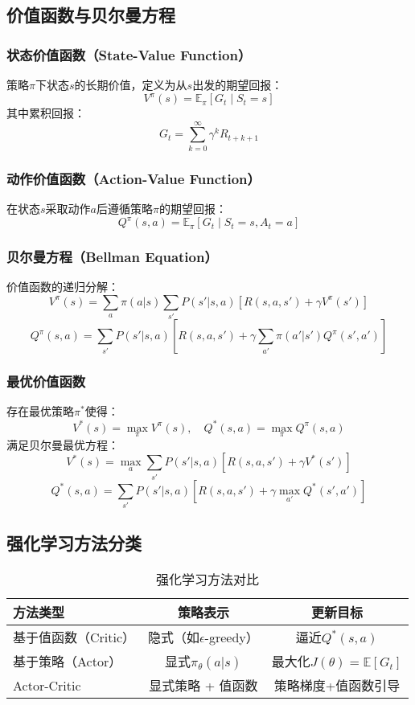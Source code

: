 \subsection{价值函数与贝尔曼方程}
\subsubsection{状态价值函数（State-Value Function）}
策略$\pi$下状态$s$的长期价值，定义为从$s$出发的期望回报：
\[
V^\pi(s) = \mathbb{E}_\pi \left[ G_t \mid S_t = s \right]
\]
其中累积回报：
\[
G_t = \sum_{k=0}^\infty \gamma^k R_{t+k+1}
\]

\subsubsection{动作价值函数（Action-Value Function）}
在状态$s$采取动作$a$后遵循策略$\pi$的期望回报：
\[
Q^\pi(s,a) = \mathbb{E}_\pi \left[ G_t \mid S_t = s, A_t = a \right]
\]

\subsubsection{贝尔曼方程（Bellman Equation）}
价值函数的递归分解：
\[
V^\pi(s) = \sum_{a} \pi(a|s) \sum_{s'} P(s'|s,a) \left[ R(s,a,s') + \gamma V^\pi(s') \right]
\]
\[
Q^\pi(s,a) = \sum_{s'} P(s'|s,a) \left[ R(s,a,s') + \gamma \sum_{a'} \pi(a'|s') Q^\pi(s',a') \right]
\]

\subsubsection{最优价值函数}
存在最优策略$\pi^*$使得：
\[
V^*(s) = \max_\pi V^\pi(s), \quad Q^*(s,a) = \max_\pi Q^\pi(s,a)
\]
满足贝尔曼最优方程：
\[
V^*(s) = \max_{a} \sum_{s'} P(s'|s,a) \left[ R(s,a,s') + \gamma V^*(s') \right]
\]
\[
Q^*(s,a) = \sum_{s'} P(s'|s,a) \left[ R(s,a,s') + \gamma \max_{a'} Q^*(s',a') \right]
\]

\subsection{强化学习方法分类}
\begin{table}[htbp]
  \centering
  \caption{强化学习方法对比}
  \begin{tabular}{lcc}
    \toprule
    \textbf{方法类型} & \textbf{策略表示} & \textbf{更新目标} \\
    \midrule
    基于值函数（Critic） & 隐式（如$\epsilon$-greedy） & 逼近$Q^*(s,a)$ \\
    基于策略（Actor） & 显式$\pi_\theta(a|s)$ & 最大化$J(\theta) = \mathbb{E}[G_t]$ \\
    Actor-Critic & 显式策略 + 值函数 & 策略梯度+值函数引导 \\
    \bottomrule
  \end{tabular}
\end{table}

